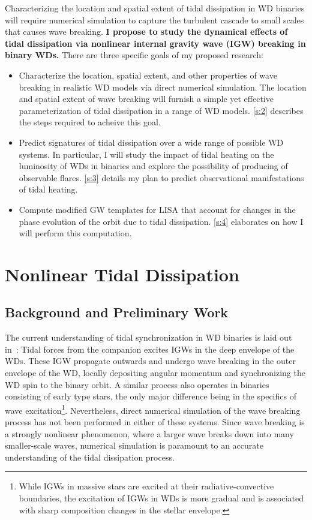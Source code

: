 \documentclass[12pt,
        usenames, %
        dvipsnames %
    ]{article}
\begin{document}
Characterizing the location and spatial extent of tidal dissipation in WD
binaries will require numerical simulation to capture the turbulent cascade to
small scales that causes wave breaking. \textbf{I propose to study the dynamical
effects of tidal dissipation via nonlinear internal gravity wave (IGW) breaking
in binary WDs.} There are three specific goals of my proposed research:
\begin{itemize}
    \item Characterize the location, spatial extent, and other properties of
        wave breaking in realistic WD models via direct numerical simulation.
        The location and spatial extent of wave breaking will furnish a simple
        yet effective parameterization of tidal dissipation in a range of WD
        models. \autoref{s:2} describes the steps required to acheive this goal.

    \item Predict signatures of tidal dissipation over a wide range of possible
        WD systems. In particular, I will study the impact of tidal heating
        on the luminosity of WDs in binaries and explore the possibility of
        producing of observable flares. \autoref{s:3} details my plan to predict
        observational manifestations of tidal heating.

    \item Compute modified GW templates for LISA that account for changes in the
        phase evolution of the orbit due to tidal dissipation. \autoref{s:4}
        elaborates on how I will perform this computation.
\end{itemize}

\section{Nonlinear Tidal Dissipation}\label{s:2}

\subsection{Background and Preliminary Work}

The current understanding of tidal synchronization in WD binaries is laid out
in~\cite{fullerII}: Tidal forces from the companion excites IGWs in the deep
envelope of the WDs. These IGW propagate outwards and undergo wave breaking in
the outer envelope of the WD, locally depositing angular momentum and
synchronizing the WD spin to the binary orbit. A similar process also
operates in binaries consisting of early type stars\cite{zahn75,gn89},
the only major difference being in the specifics of wave
excitation\footnote{While IGWs in massive stars are excited at their
radiative-convective boundaries, the excitation of IGWs in WDs is more gradual
and is associated with sharp composition changes in the stellar
envelope\cite{fullerII}.}. Nevertheless, direct numerical simulation of the wave
breaking process has not been performed in either of these systems. Since wave
breaking is a strongly nonlinear phenomenon, where a larger wave breaks down
into many smaller-scale waves, numerical simulation is paramount to an accurate
understanding of the tidal dissipation process.
\end{document}
